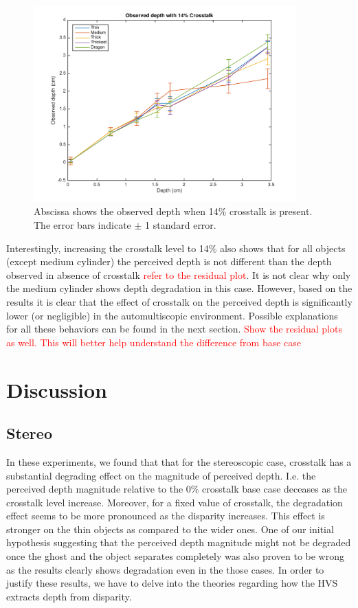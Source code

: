 \begin{figure}[H]
\centering
    \includegraphics[width=0.9\textwidth]{./Template_Figures/a_crosstalk_14}
    \caption{Abscissa shows the observed depth when 14\% crosstalk is present. The error bars indicate $\pm$ 1 standard error.\label{fig:a_crosstalk_14}}
\end{figure}
Interestingly, increasing the crosstalk level to 14\% also shows that for all objects (except medium cylinder) the perceived depth is not different than the depth observed in absence of crosstalk \textcolor{red}{refer to the residual plot}. It is not clear why only the medium cylinder shows depth degradation in this case. However, based on the results it is clear that the effect of crosstalk on the perceived depth is significantly lower (or negligible) in the automultiscopic environment. Possible explanations for all these behaviors can be found in the next section.
\textcolor{red}{Show the residual plots as well. This will better help understand the difference from base case}

\section {Discussion}
\subsection{Stereo}
In these experiments, we found that that for the stereoscopic case, crosstalk has a substantial degrading effect on the magnitude of perceived depth. I.e. the perceived depth magnitude relative to the 0\% crosstalk base case deceases as the crosstalk level increase. Moreover, for a fixed value of crosstalk, the degradation effect seems to be more pronounced as the disparity increases. This effect is stronger on the thin objects as compared to the wider ones. One of our initial hypothesis suggesting that the perceived depth magnitude might not be degraded once the ghost and the object separates completely was also proven to be wrong as the results clearly shows degradation even in the those cases. In order to justify these results, we have to delve into the theories regarding how the HVS extracts depth from disparity.

